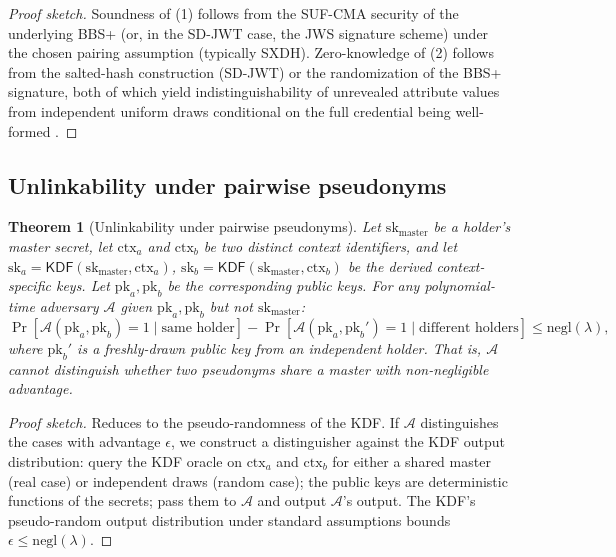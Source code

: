 \documentclass[11pt,a4paper,parskip=half-,DIV=12,headings=standardclasses]{scrartcl}
\theoremstyle{ncthm}
\newtheorem{theorem}{Theorem}[section]
\theoremstyle{ncdef}
\newcommand{\Negl}{\mathrm{negl}}
\newcommand{\KDF}{\mathsf{KDF}}
\begin{document}
\begin{proof}[Proof sketch]
Soundness of (1) follows from the SUF-CMA security of the underlying
BBS+ (or, in the SD-JWT case, the JWS signature scheme) under the
chosen pairing assumption (typically SXDH). Zero-knowledge of (2)
follows from the salted-hash construction (SD-JWT) or the
randomization of the BBS+ signature, both of which yield
indistinguishability of unrevealed attribute values from independent
uniform draws conditional on the full credential being well-formed
\cite{w3c-vcdm-2,openid-vp-1}.
\end{proof}

\subsection{Unlinkability under pairwise pseudonyms}

\begin{theorem}[Unlinkability under pairwise pseudonyms]\label{thm:unlinkable}
Let $\mathrm{sk}_{\mathrm{master}}$ be a holder's master secret, let
$\mathrm{ctx}_a$ and $\mathrm{ctx}_b$ be two distinct context
identifiers, and let
$\mathrm{sk}_{a} = \KDF(\mathrm{sk}_{\mathrm{master}}, \mathrm{ctx}_a)$,
$\mathrm{sk}_{b} = \KDF(\mathrm{sk}_{\mathrm{master}}, \mathrm{ctx}_b)$
be the derived context-specific keys. Let $\mathrm{pk}_a, \mathrm{pk}_b$
be the corresponding public keys. For any polynomial-time adversary
$\mathcal{A}$ given $\mathrm{pk}_a, \mathrm{pk}_b$ but not
$\mathrm{sk}_{\mathrm{master}}$:
\[
\Pr[\mathcal{A}(\mathrm{pk}_a, \mathrm{pk}_b) = 1 \mid \text{same holder}]
- \Pr[\mathcal{A}(\mathrm{pk}_a, \mathrm{pk}_b') = 1 \mid \text{different holders}]
\leq \Negl(\lambda),
\]
where $\mathrm{pk}_b'$ is a freshly-drawn public key from an
independent holder. That is, $\mathcal{A}$ cannot distinguish whether
two pseudonyms share a master with non-negligible advantage.
\end{theorem}

\begin{proof}[Proof sketch]
Reduces to the pseudo-randomness of the KDF. If
$\mathcal{A}$ distinguishes the cases with advantage $\epsilon$, we
construct a distinguisher against the KDF output distribution: query
the KDF oracle on $\mathrm{ctx}_a$ and $\mathrm{ctx}_b$ for either a
shared master (real case) or independent draws (random case); the
public keys are deterministic functions of the secrets; pass them to
$\mathcal{A}$ and output $\mathcal{A}$'s output. The KDF's
pseudo-random output distribution under standard assumptions
\cite{nist-fips-203} bounds $\epsilon \leq \Negl(\lambda)$.
\end{proof}
\end{document}
